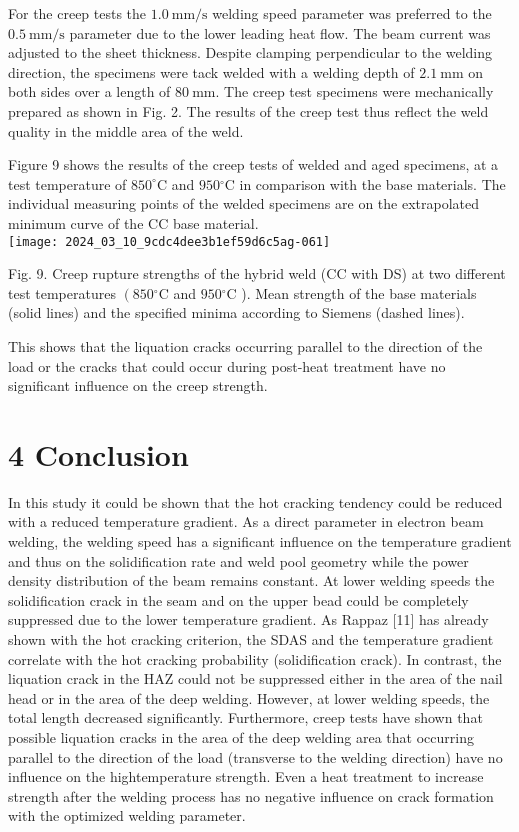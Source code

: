 \documentclass[10pt]{article}
\begin{document}
For the creep tests the $1.0 \mathrm{~mm} / \mathrm{s}$ welding speed parameter was preferred to the $0.5 \mathrm{~mm} / \mathrm{s}$ parameter due to the lower leading heat flow. The beam current was adjusted to the sheet thickness. Despite clamping perpendicular to the welding direction, the specimens were tack welded with a welding depth of $2.1 \mathrm{~mm}$ on both sides over a length of $80 \mathrm{~mm}$. The creep test specimens were mechanically prepared as shown in Fig. 2. The results of the creep test thus reflect the weld quality in the middle area of the weld.

Figure 9 shows the results of the creep tests of welded and aged specimens, at a test temperature of $850^{\circ} \mathrm{C}$ and $950{ }^{\circ} \mathrm{C}$ in comparison with the base materials. The individual measuring points of the welded specimens are on the extrapolated minimum curve of the $\mathrm{CC}$ base material.\\
\texttt{[image: 2024\_03\_10\_9cdc4dee3b1ef59d6c5ag-061]}

Fig. 9. Creep rupture strengths of the hybrid weld (CC with DS) at two different test temperatures $\left(850{ }^{\circ} \mathrm{C}\right.$ and $950{ }^{\circ} \mathrm{C}$ ). Mean strength of the base materials (solid lines) and the specified minima according to Siemens (dashed lines).

This shows that the liquation cracks occurring parallel to the direction of the load or the cracks that could occur during post-heat treatment have no significant influence on the creep strength.

\section*{4 Conclusion}
In this study it could be shown that the hot cracking tendency could be reduced with a reduced temperature gradient. As a direct parameter in electron beam welding, the welding speed has a significant influence on the temperature gradient and thus on the solidification rate and weld pool geometry while the power density distribution of the beam remains constant. At lower welding speeds the solidification crack in the seam and on the upper bead could be completely suppressed due to the lower temperature gradient. As Rappaz [11] has already shown with the hot cracking criterion, the SDAS and the temperature gradient correlate with the hot cracking probability (solidification crack). In contrast, the liquation crack in the HAZ could not be suppressed either in the area of the nail head or in the area of the deep welding. However, at lower welding speeds, the total length decreased significantly. Furthermore, creep tests have shown that possible liquation cracks in the area of the deep welding area that occurring parallel to the direction of the load (transverse to the welding direction) have no influence on the hightemperature strength. Even a heat treatment to increase strength after the welding process has no negative influence on crack formation with the optimized welding parameter.
\end{document}
